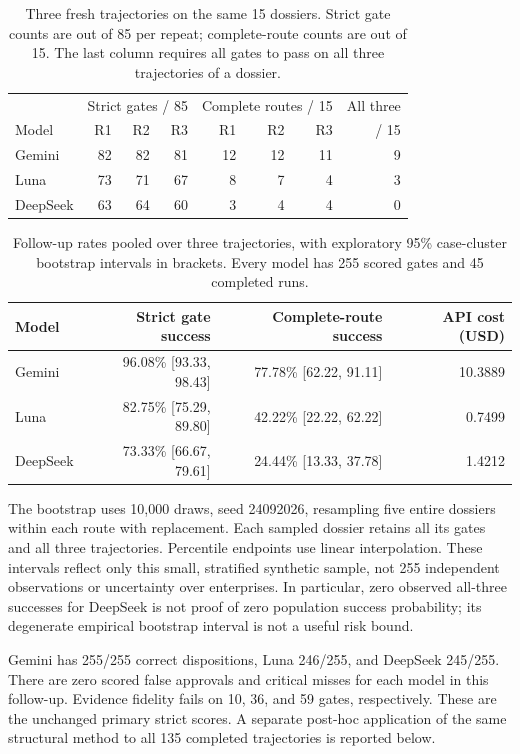 \begin{table}[!htb]
\centering\small
\caption{Three fresh trajectories on the same 15 dossiers. Strict gate counts are out of 85
per repeat; complete-route counts are out of 15. The last column requires all gates to pass
on all three trajectories of a dossier.}
\label{tab:repetitions}
\begin{tabular}{@{}lrrrrrrr@{}}
\toprule
& \multicolumn{3}{c}{Strict gates / 85} & \multicolumn{3}{c}{Complete routes / 15} & All three\\
Model & R1 & R2 & R3 & R1 & R2 & R3 & / 15\\
\midrule
Gemini & 82 & 82 & 81 & 12 & 12 & 11 & 9\\
Luna & 73 & 71 & 67 & 8 & 7 & 4 & 3\\
DeepSeek & 63 & 64 & 60 & 3 & 4 & 4 & 0\\
\bottomrule
\end{tabular}
\end{table}

\begin{table}[!htb]
\centering\small
\caption{Follow-up rates pooled over three trajectories, with exploratory 95\% case-cluster
bootstrap intervals in brackets. Every model has 255 scored gates and 45 completed runs.}
\begin{tabular}{@{}lrrr@{}}
\toprule
Model & Strict gate success & Complete-route success & API cost (USD)\\
\midrule
Gemini & 96.08\% [93.33, 98.43] & 77.78\% [62.22, 91.11] & 10.3889\\
Luna & 82.75\% [75.29, 89.80] & 42.22\% [22.22, 62.22] & 0.7499\\
DeepSeek & 73.33\% [66.67, 79.61] & 24.44\% [13.33, 37.78] & 1.4212\\
\bottomrule
\end{tabular}
\end{table}

The bootstrap uses 10,000 draws, seed 24092026, resampling five entire dossiers within each
route with replacement. Each sampled dossier retains all its gates and all three trajectories.
Percentile endpoints use linear interpolation. These intervals reflect only this small,
stratified synthetic sample, not 255 independent observations or uncertainty over enterprises.
In particular, zero observed all-three successes for DeepSeek is not proof of zero population
success probability; its degenerate empirical bootstrap interval is not a useful risk bound.

Gemini has 255/255 correct dispositions, Luna 246/255, and DeepSeek 245/255. There are zero
scored false approvals and critical misses for each model in this follow-up. Evidence fidelity
fails on 10, 36, and 59 gates, respectively. These are the unchanged primary strict scores. A separate post-hoc application of the same
structural method to all 135 completed trajectories is reported below.

